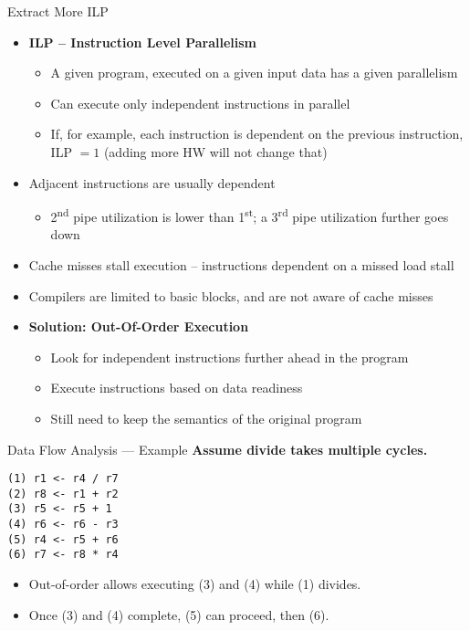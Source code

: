 \documentclass[aspectratio=169]{beamer}
\begin{document}
\begin{frame}{Extract More ILP}
\begin{itemize}
  \item \textbf{ILP -- Instruction Level Parallelism}
  \begin{itemize}
    \item A given program, executed on a given input data has a given parallelism
    \item Can execute only independent instructions in parallel
    \item If, for example, each instruction is dependent on the previous instruction, ILP $= 1$ (adding more HW will not change that)
  \end{itemize}
  \item Adjacent instructions are usually dependent
  \begin{itemize}
    \item 2\textsuperscript{nd} pipe utilization is lower than 1\textsuperscript{st}; a 3\textsuperscript{rd} pipe utilization further goes down
  \end{itemize}
  \item Cache misses stall execution -- instructions dependent on a missed load stall
  \item Compilers are limited to basic blocks, and are not aware of cache misses
  \item \textbf{Solution: Out-Of-Order Execution}
  \begin{itemize}
    \item Look for independent instructions further ahead in the program
    \item Execute instructions based on data readiness
    \item Still need to keep the semantics of the original program
  \end{itemize}
\end{itemize}
\end{frame}

\begin{frame}[fragile]{Data Flow Analysis --- Example}
\textbf{Assume divide takes multiple cycles.}
\vspace{0.5em}

\begin{verbatim}
(1) r1 <- r4 / r7
(2) r8 <- r1 + r2
(3) r5 <- r5 + 1
(4) r6 <- r6 - r3
(5) r4 <- r5 + r6
(6) r7 <- r8 * r4
\end{verbatim}

\begin{itemize}
  \item Out-of-order allows executing (3) and (4) while (1) divides.
  \item Once (3) and (4) complete, (5) can proceed, then (6).
\end{itemize}
\end{frame}
\end{document}
